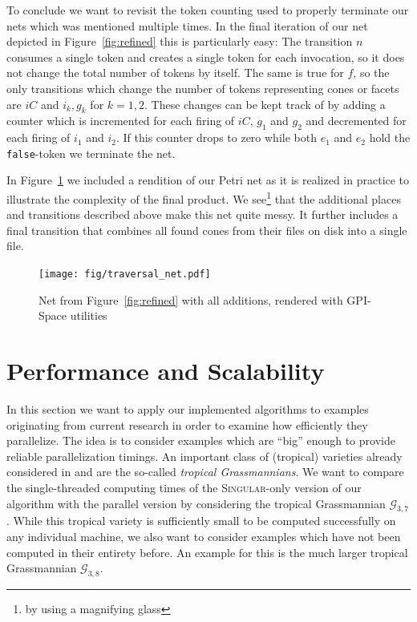 \documentclass[
  paper=a4,
  titlepage,
  bibliography=totoc,
  pagesize=pdftex
]{scrartcl}
\numberwithin{figure}{section}
\numberwithin{equation}{section}
\numberwithin{table}{section}
\theoremstyle{definition}
\numberwithin{definition}{section}
\begin{document}
To conclude we want to revisit the token counting used to properly terminate our nets
which was mentioned multiple times. In the final iteration of our net depicted in
Figure~\ref{fig:refined} this is particularly easy: The transition $n$ consumes a single
token and creates a single token for each invocation, so it does not change the total
number of tokens by itself. The same is true for $f$, so the only transitions which change
the number of tokens representing cones or facets are $iC$ and $i_k, g_k$ for $k=1,2$.
These changes can be kept track of by adding a counter which is incremented for each
firing of $iC$, $g_1$ and $g_2$ and decremented for each firing of $i_1$ and $i_2$. If
this counter drops to zero while both $e_1$ and $e_2$ hold the \texttt{false}-token we
terminate the net.

In Figure~\ref{fig:full_net} we included a rendition of our Petri net as it is realized in
practice to illustrate the complexity of the final product. We see\footnote{by using a
magnifying glass} that the additional places and transitions described above make this net
quite messy. It further includes a final transition that combines all found cones from
their files on disk into a single file.

\begin{figure}[htbp]
  \texttt{[image: fig/traversal\_net.pdf]}
  \caption{Net from Figure~\ref{fig:refined} with all additions, rendered with GPI-Space
  utilities}
  \label{fig:full_net}
\end{figure}

\section{Performance and Scalability}

In this section we want to apply our implemented algorithms to examples originating from
current research in order to examine how efficiently they parallelize. The idea is to
consider examples which are \enquote{big} enough to provide reliable parallelization
timings. An important class of (tropical) varieties already considered in
\cite{tropPointsLinks} and \cite{tropGrass} are the so-called \emph{tropical
Grassmannians}. We want to compare the single-threaded computing times of the
\textsc{Singular}-only version of our algorithm with the parallel version by considering
the tropical Grassmannian $\mathcal G_{3,7}$. While this tropical variety is sufficiently
small to be computed successfully on any individual machine, we also want to consider
examples which have not been computed in their entirety before. An example for this is the
much larger tropical Grassmannian $\mathcal G_{3,8}$.
\end{document}
